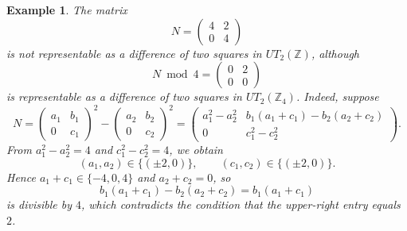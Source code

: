 \documentclass[11pt]{amsart}
\newtheorem{exa}{Example}
\begin{document}
\begin{exa}\label{exa:N}
   The matrix 
$$N=\begin{pmatrix}
4 & 2\\
0 & 4\end{pmatrix}$$
is not representable as a difference of two squares in $UT_2(\mathbb Z)$, although
$$N \bmod 4 =\begin{pmatrix}
0 & 2\\
0 & 0\end{pmatrix}$$
is representable as a difference of two squares in $UT_2(\mathbb Z_4)$.
Indeed, suppose
$$N=
\begin{pmatrix}
a_1 & b_1\\
0 & c_1
\end{pmatrix}^2-
\begin{pmatrix}
a_2 & b_2\\
0 & c_2
\end{pmatrix}^2=\begin{pmatrix}
a_1^2-a_2^2 &
b_1(a_1+c_1)- b_2(a_2+c_2)\\
0 &
c_1^2-c_2^2
\end{pmatrix}.$$
From $a_1^2-a_2^2=4$ and $c_1^2-c_2^2=4$, we obtain
$$(a_1,a_2)\in\{(\pm2,0)\},\qquad
(c_1,c_2)\in\{(\pm2,0)\}.$$
Hence $a_1+c_1\in\{-4,0,4\}$ and $a_2+c_2=0$, so
$$b_1(a_1+c_1)-b_2(a_2+c_2)=b_1(a_1+c_1)$$
is divisible by $4$, which contradicts the condition that the upper-right entry equals $2$.
\end{exa}
\end{document}

